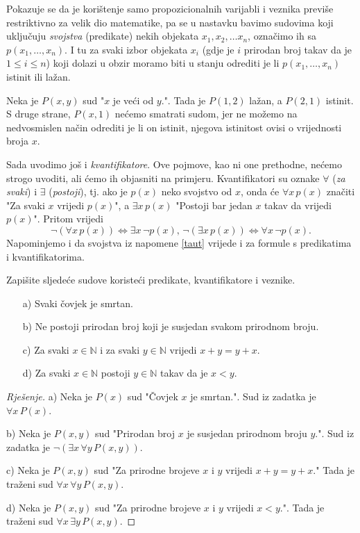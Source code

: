 Pokazuje se da je korištenje samo propozicionalnih varijabli i veznika previše restriktivno za velik dio matematike, pa se u nastavku bavimo sudovima koji uključuju \textit{svojstva} (predikate) nekih objekata $x_1, x_2,\dots x_n$, označimo ih sa $p(x_1, \dots, x_n)$. I tu za svaki izbor objekata $x_i$ (gdje je $i$ prirodan broj takav da je $1\leq i\leq n$) koji dolazi u obzir moramo biti u stanju odrediti je li $p(x_1, \dots, x_n)$ istinit ili lažan. 
\begin{exmp}
Neka je $P(x, y)$ sud "$x$ je veći od $y$.". Tada je $P(1, 2)$ lažan, a $P(2, 1)$ istinit. S druge strane, $P(x, 1)$ nećemo smatrati sudom, jer ne možemo na nedvosmislen način odrediti je li on istinit, njegova istinitost ovisi o vrijednosti broja $x$. 
\end{exmp}
Sada uvodimo još i \textit{kvantifikatore}. Ove pojmove, kao ni one prethodne, nećemo strogo uvoditi, ali ćemo ih objasniti na primjeru. Kvantifikatori su oznake $\forall$ (\textit{za svaki}) i $\exists$ (\textit{postoji}), tj. ako je $p(x)$ neko svojstvo od $x$, onda će $\forall{x}\, p(x)$ značiti "Za svaki $x$ vrijedi $p(x)$", a $\exists{x}\, p(x)$ "Postoji bar jedan $x$ takav da vrijedi $p(x)$". Pritom vrijedi
$$\neg \left(\forall{x}\, p(x)\right)\Leftrightarrow \exists{x}\, \neg p(x), \, \neg \left(\exists{x}\, p(x)\right)\Leftrightarrow \forall{x}\, \neg p(x).$$
Napominjemo i da svojstva iz napomene \ref{taut} vrijede i za formule s predikatima i kvantifikatorima.
\begin{exercise}
Zapišite sljedeće sudove koristeći predikate, kvantifikatore i veznike.
\begin{itemize}
\item[a)] Svaki čovjek je smrtan.
\item[b)] Ne postoji prirodan broj koji je susjedan svakom prirodnom broju.
\item[c)] Za svaki $x\in \mathbb{N}$ i za svaki $y\in \mathbb{N}$ vrijedi $x+y=y+x$.
\item[d)] Za svaki $x\in \mathbb{N}$ postoji $y\in \mathbb{N}$ takav da je $x<y$.
\end{itemize}
\end{exercise}
\begin{proof}[Rješenje]
a) Neka je $P(x)$ sud "Čovjek $x$ je smrtan.". Sud iz zadatka je $\forall{x}\, P(x)$.

b) Neka je $P(x, y)$ sud "Prirodan broj $x$ je susjedan prirodnom broju $y$.". Sud iz zadatka je $\neg(\exists{x}\, \forall{y}\, P(x, y))$.

c) Neka je $P(x, y)$ sud "Za prirodne brojeve $x$ i $y$ vrijedi $x+y=y+x$." Tada je traženi sud $\forall{x}\, \forall{y}\, P(x, y)$.

d) Neka je $P(x, y)$ sud "Za prirodne brojeve $x$ i $y$ vrijedi $x<y$.". Tada je traženi sud $\forall{x}\,\exists{y}\, P(x, y)$.
\end{proof}
